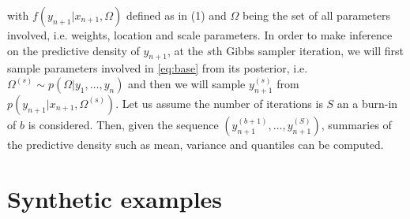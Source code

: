 \documentclass{article} %
\begin{document}
with $f\left(y_{n+1}|x_{n+1},\Omega\right)$ defined as in (1) and $\Omega$ being the set of all parameters involved, i.e. weights, location and scale parameters. In order to make inference on the predictive density of $y_{n+1}$, at the $s$th  Gibbs sampler iteration, we will first sample parameters involved in \ref{eq:base} from its posterior, i.e. $\Omega^{(s)} \sim p\left(\Omega|y_1, \ldots, y_n\right)$ and then we will sample $y^{(s)}_{n+1}$ from $ p\left(y_{n+1}|x_{n+1},\Omega^{(s)}\right)$. Let us assume the number of iterations is $S$ an a burn-in of $b$ is considered. Then, given the sequence $\left(y^{(b+1)}_{n+1}, \ldots, y^{(S)}_{n+1}\right)$, summaries of the predictive density such as mean, variance and quantiles can be computed. 


\section{Synthetic examples}
\end{document}
